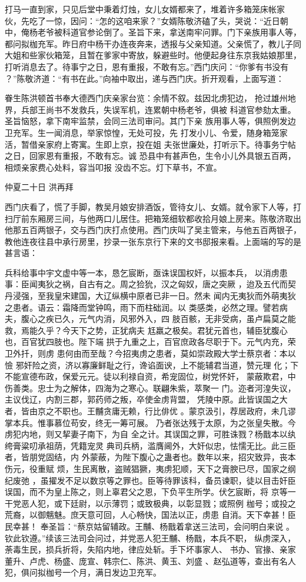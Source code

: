 打马一直到家，只见后堂中秉着灯烛，女儿女婿都来了，堆着许多箱笼床帐家
伙，先吃了一惊，因问：“怎的这咱来家？”女婿陈敬济磕了头，哭说：“近日朝
中，俺杨老爷被科道官参论倒了。圣旨下来，拿送南牢问罪。门下亲族用事人等，
都问拟枷充军。昨日府中杨干办连夜奔来，透报与父亲知道。父亲慌了，教儿子同
大姐和些家伙箱笼，且暂在爹家中寄放，躲避些时。他便起身往东京我姑娘那里，
打听消息去了。待事宁之日，恩有重报，不敢有忘。”西门庆问：“你爹有书没有
？”陈敬济道：“有书在此。”向袖中取出，递与西门庆。折开观看，上面写道：

眷生陈洪顿首书奉大德西门庆亲家台览：余情不叙。兹因北虏犯边，
抢过雄州地界，兵部王尚书不发救兵，失误军机，连累朝中杨老爷，俱被
科道官参劾太重。圣旨恼怒，拿下南牢监禁，会同三法司审问。其门下亲
族用事人等，俱照例发边卫充军。生一闻消息，举家惊惶，无处可投，先
打发小儿、令爱，随身箱笼家活，暂借亲家府上寄寓。生即上京，投在姐
夫张世廉处，打听示下。待事务宁帖之日，回家恩有重报，不敢有忘。诚
恐县中有甚声色，生令小儿外具银五百两，相烦亲家费心处料，容当叩报
没齿不忘。灯下草书，不宣。

仲夏二十日  洪再拜

西门庆看了，慌了手脚，教吴月娘安排酒饭，管待女儿、女婿。就令家下人等，打
扫厅前东厢房三间，与他两口儿居住。把箱笼细软都收拾月娘上房来。陈敬济取出
他那五百两银子，交与西门庆打点使用。西门庆叫了吴主管来，与他五百两银子，
教他连夜往县中承行房里，抄录一张东京行下来的文书邸报来看。上面端的写的是
甚言语：

兵科给事中宇文虚中等一本，恳乞宸断，亟诛误国权奸，以振本兵，
以消虏患事：臣闻夷狄之祸，自古有之。周之猃狁，汉之匈奴，唐之突厥
，迨及五代而契丹浸强，至我皇宋建国，大辽纵横中原者已非一日。然未
闻内无夷狄而外萌夷狄之患者。语云：霜降而堂钟鸣，雨下而柱础润。以
类感类，必然之理。譬若病夫，腹心之疾已久，元气内消，风邪外入，四
肢百骸，无非受病，虽卢扁莫之能救，焉能久乎？今天下之势，正犹病夫
尪羸之极矣。君犹元首也，辅臣犹腹心也，百官犹四肢也。陛下端
拱于九重之上，百官庶政各尽职于下。元气内充，荣卫外扦，则虏
患何由而至哉？今招夷虏之患者，莫如崇政殿大学士蔡京者：本以憸
邪奸险之资，济以寡廉鲜耻之行，谗谄面谀，上不能辅君当道，赞元理
化；下不能宣德布政，保爱元元。徒以利禄自资，希宠固位，树党怀奸，
蒙蔽欺君，中伤善类。忠士为之解体，四海为之寒心。联翩朱紫，萃聚一
门。迩者河湟失议，主议伐辽，内割三郡，郭药师之叛，卒使金虏背盟，
凭陵中原。此皆误国之大者，皆由京之不职也。王黼贪庸无赖，行比俳优
。蒙京汲引，荐居政府，未几谬掌本兵。惟事慕位苟安，终无一筹可展。
乃者张达残于太原，为之张皇失散。今虏犯内地，则又挈妻子南下，为自
全之计。其误国之罪，可胜诛戮？杨戬本以纨绔膏粱叨承祖荫，凭籍宠灵
典司兵柄，滥膺阃外，大奸似忠，怯懦无比。此三臣者，皆朋党固结，内
外蒙蔽，为陛下腹心之蛊者也。数年以来，招灾致异，丧本伤元，役重赋
烦，生民离散，盗贼猖獗，夷虏犯顺，天下之膏腴已尽，国家之纲纪废弛
，虽擢发不足以数京等之罪也。臣等待罪该科，备员谏职，徒以目击奸臣
误国，而不为皇上陈之，则上辜君父之恩，下负平生所学。伏乞宸断，将
京等一干党恶人犯，或下廷尉，以示薄罚；或致极典，以彰显戮；或照例
枷号；或投之荒裔，以御魑魅。庶天意可回，人心畅快，国法以正，虏患
自消。天下幸甚！臣民幸甚！
奉圣旨：“蔡京姑留辅政。王黼、杨戬着拿送三法司，会问明白来说
。钦此钦遵。”续该三法司会问过，并党恶人犯王黼、杨戬，本兵不职，
纵虏深入，荼毒生民，损兵折将，失陷内地，律应处斩。手下坏事家人、
书办、官掾、亲家董升、卢虎、杨盛、庞宣、韩宗仁、陈洪、黄玉、刘盛
、赵弘道等，查出有名人犯，俱问拟枷号一个月，满日发边卫充军。

